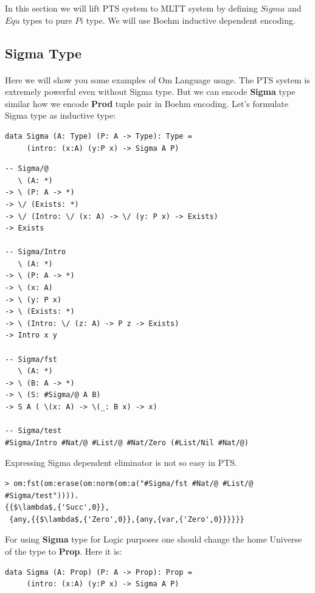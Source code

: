 \documentclass[11pt,oneside]{article}
\begin{document}
In this section we will lift PTS system to MLTT system by defining
$Sigma$ and $Equ$ types to pure $Pi$ type. We will use Boehm inductive
dependent encoding.

\subsection{Sigma Type}

\paragraph{}
Here we will show you some examples of Om Language usage.
The PTS system is extremely powerful even without Sigma type. But
we can encode {\bf Sigma} type similar how we encode {\bf Prod}
tuple pair in Boehm encoding. Let's formulate Sigma type as inductive type:

\begin{lstlisting}[mathescape=true]
data Sigma (A: Type) (P: A -> Type): Type =
     (intro: (x:A) (y:P x) -> Sigma A P)
\end{lstlisting}

\begin{lstlisting}[mathescape=true]
-- Sigma/@
   \ (A: *)
-> \ (P: A -> *)
-> \/ (Exists: *)
-> \/ (Intro: \/ (x: A) -> \/ (y: P x) -> Exists)
-> Exists

-- Sigma/Intro
   \ (A: *)
-> \ (P: A -> *)
-> \ (x: A)
-> \ (y: P x)
-> \ (Exists: *)
-> \ (Intro: \/ (z: A) -> P z -> Exists)
-> Intro x y

-- Sigma/fst
   \ (A: *)
-> \ (B: A -> *)
-> \ (S: #Sigma/@ A B)
-> S A ( \(x: A) -> \(_: B x) -> x)

-- Sigma/test
#Sigma/Intro #Nat/@ #List/@ #Nat/Zero (#List/Nil #Nat/@)
\end{lstlisting}

Expressing Sigma dependent eliminator is not so easy in PTS.

\begin{lstlisting}[mathescape=true]
> om:fst(om:erase(om:norm(om:a("#Sigma/fst #Nat/@ #List/@ #Sigma/test")))).
{{$\lambda$,{'Succ',0}},
 {any,{{$\lambda$,{'Zero',0}},{any,{var,{'Zero',0}}}}}}
\end{lstlisting}

For using {\bf Sigma} type for Logic purposes one should change the
home Universe of the type to {\bf Prop}. Here it is:

\begin{lstlisting}[mathescape=true]
data Sigma (A: Prop) (P: A -> Prop): Prop =
     (intro: (x:A) (y:P x) -> Sigma A P)
\end{lstlisting}
\end{document}
